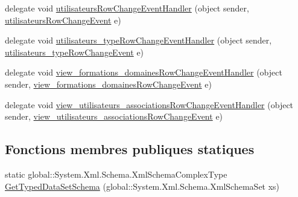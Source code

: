 \begin{DoxyCompactItemize}
\item 
delegate void \hyperlink{classforma_1_1formadb_data_set_a1b81714a5a0dd27994063c57cb9ae217}{utilisateurs\+Row\+Change\+Event\+Handler} (object sender, \hyperlink{classforma_1_1formadb_data_set_1_1utilisateurs_row_change_event}{utilisateurs\+Row\+Change\+Event} e)
\item 
delegate void \hyperlink{classforma_1_1formadb_data_set_a2a56ecb3882d31aadc784fe0ce9c74e0}{utilisateurs\+\_\+type\+Row\+Change\+Event\+Handler} (object sender, \hyperlink{classforma_1_1formadb_data_set_1_1utilisateurs__type_row_change_event}{utilisateurs\+\_\+type\+Row\+Change\+Event} e)
\item 
delegate void \hyperlink{classforma_1_1formadb_data_set_afcbb910689f00b10eff440c0637f5885}{view\+\_\+formations\+\_\+domaines\+Row\+Change\+Event\+Handler} (object sender, \hyperlink{classforma_1_1formadb_data_set_1_1view__formations__domaines_row_change_event}{view\+\_\+formations\+\_\+domaines\+Row\+Change\+Event} e)
\item 
delegate void \hyperlink{classforma_1_1formadb_data_set_a38e27bcaaf1b6cd5ec25baa6da0ac23b}{view\+\_\+utilisateurs\+\_\+associations\+Row\+Change\+Event\+Handler} (object sender, \hyperlink{classforma_1_1formadb_data_set_1_1view__utilisateurs__associations_row_change_event}{view\+\_\+utilisateurs\+\_\+associations\+Row\+Change\+Event} e)
\end{DoxyCompactItemize}
\subsection*{Fonctions membres publiques statiques}
\begin{DoxyCompactItemize}
\item 
static global\+::\+System.\+Xml.\+Schema.\+Xml\+Schema\+Complex\+Type \hyperlink{classforma_1_1formadb_data_set_a84bfca50bc009a3eb74dcc3ccf6e9dcc}{Get\+Typed\+Data\+Set\+Schema} (global\+::\+System.\+Xml.\+Schema.\+Xml\+Schema\+Set xs)
\end{DoxyCompactItemize}

